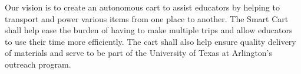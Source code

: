 Our vision is to create an autonomous cart to assist educators by helping to transport and power various items from one place to another. The Smart Cart shall help ease the burden of having to make multiple trips and allow educators to use their time more efficiently. The cart shall also help ensure quality delivery of materials and serve to be part of the University of Texas at Arlington's outreach program. 
